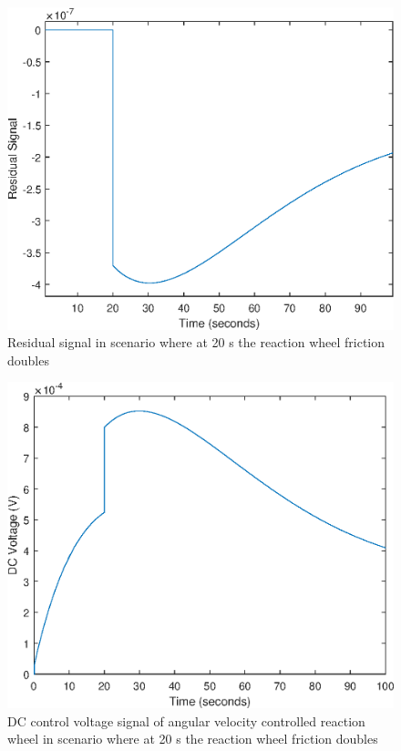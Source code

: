 \begin{figure}[h]
	\centering
	\includegraphics[width=120mm]{figures/residual_Noreconfig}
	\caption{Residual signal in scenario where at 20 s the reaction wheel friction doubles}
	\label{fig:residual}
\end{figure} 

\begin{figure}[H]
	\centering
	\includegraphics[width=120mm]{figures/voltage_Noreconfig}
	\caption{DC control voltage signal of angular velocity controlled reaction wheel in scenario where at 20 s the reaction wheel friction doubles}
	\label{fig:rwFaultRes3}
\end{figure} 

